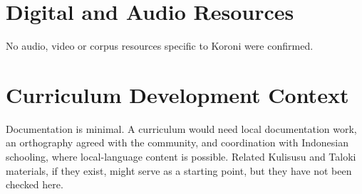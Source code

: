 \documentclass[12pt]{article}
\begin{document}
\section{Digital and Audio Resources}
No audio, video or corpus resources specific to Koroni were confirmed.

\section{Curriculum Development Context}
Documentation is minimal. A curriculum would need local documentation work, an orthography agreed with the community, and coordination with Indonesian schooling, where local-language content is possible. Related Kulisusu and Taloki materials, if they exist, might serve as a starting point, but they have not been checked here.
\end{document}
